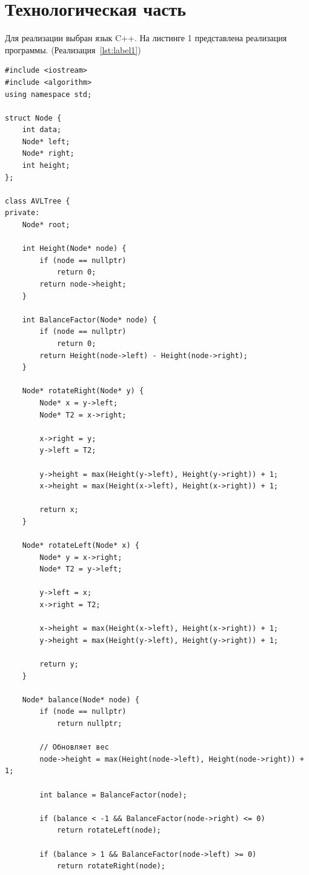 \documentclass[12pt, a4paper]{article}
\begin{document}
\section{Технологическая часть}
Для реализации выбран язык C++.
На листинге 1 представлена реализация программы.
(Реализация~\ref{lst:label1})
\begin{lstlisting}[caption={Исходный код}, label={lst:label1}]
#include <iostream>
#include <algorithm>
using namespace std;

struct Node {
    int data;
    Node* left;
    Node* right;
    int height;
};

class AVLTree {
private:
    Node* root;

    int Height(Node* node) {
        if (node == nullptr)
            return 0;
        return node->height;
    }

    int BalanceFactor(Node* node) {
        if (node == nullptr)
            return 0;
        return Height(node->left) - Height(node->right);
    }

    Node* rotateRight(Node* y) {
        Node* x = y->left;
        Node* T2 = x->right;

        x->right = y;
        y->left = T2;

        y->height = max(Height(y->left), Height(y->right)) + 1;
        x->height = max(Height(x->left), Height(x->right)) + 1;

        return x;
    }

    Node* rotateLeft(Node* x) {
        Node* y = x->right;
        Node* T2 = y->left;

        y->left = x;
        x->right = T2;

        x->height = max(Height(x->left), Height(x->right)) + 1;
        y->height = max(Height(y->left), Height(y->right)) + 1;

        return y;
    }

    Node* balance(Node* node) {
        if (node == nullptr)
            return nullptr;

        // Обновляет вес
        node->height = max(Height(node->left), Height(node->right)) + 1;

        int balance = BalanceFactor(node);
        
        if (balance < -1 && BalanceFactor(node->right) <= 0)
            return rotateLeft(node);

        if (balance > 1 && BalanceFactor(node->left) >= 0)
            return rotateRight(node);
        

\end{lstlisting}
\end{document}
